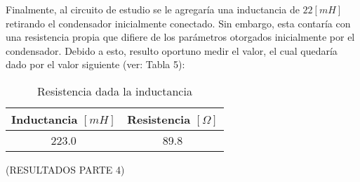 Finalmente, al circuito de estudio se le agregaría una inductancia de $22[mH]$ retirando el condensador
inicialmente conectado. Sin embargo, esta contaría con una resistencia propia que difiere de los parámetros
otorgados inicialmente por el condensador. Debido a esto, resulto oportuno medir el valor, el cual quedaría
dado por el valor siguiente (ver: Tabla 5): \\
{%
\begin{table}
    \begin{tabular}{|c|c|}
     \hline
        Inductancia $[mH]$ & Resistencia $[\Omega]$ \\ \hline
        223.0 & 89.8  \\ \hline
     \end{tabular}
     \caption{Resistencia dada la inductancia}
\end{table}
}



{\LARGE (RESULTADOS PARTE 4)} \\
